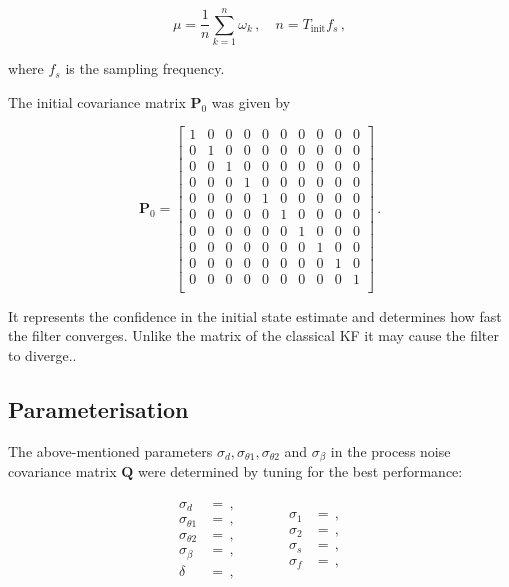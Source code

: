 \begin{equation}
  \mu = \frac{1}{n} \sum_{k=1}^{n}{\omega_k}\,, \quad n = T_{\text{init}} f_s\,,
\end{equation}

\noindent
where $f_s$ is the sampling frequency.

The initial covariance matrix $\mathbf{P}_{0}$ was given by

\begin{equation}
\mathbf{P}_0 = \begin{bmatrix}
  1 & 0 & 0 & 0 & 0 & 0 & 0 & 0 & 0 & 0\\
  0 & 1 & 0 & 0 & 0 & 0 & 0 & 0 & 0 & 0\\
  0 & 0 & 1 & 0 & 0 & 0 & 0 & 0 & 0 & 0\\
  0 & 0 & 0 & 1 & 0 & 0 & 0 & 0 & 0 & 0\\
  0 & 0 & 0 & 0 & 1 & 0 & 0 & 0 & 0 & 0\\
  0 & 0 & 0 & 0 & 0 & 1 & 0 & 0 & 0 & 0\\
  0 & 0 & 0 & 0 & 0 & 0 & 1 & 0 & 0 & 0\\
  0 & 0 & 0 & 0 & 0 & 0 & 0 & 1 & 0 & 0\\
  0 & 0 & 0 & 0 & 0 & 0 & 0 & 0 & 1 & 0\\
  0 & 0 & 0 & 0 & 0 & 0 & 0 & 0 & 0 & 1\\
\end{bmatrix}\,.
\end{equation}

\noindent
It represents the confidence in the initial state estimate and determines how fast the filter converges. Unlike the matrix of the classical KF it may cause the filter to diverge..

\subsection{Parameterisation}

The above-mentioned parameters $\sigma_d, \sigma_{\theta 1}, \sigma_{\theta 2}$ and $\sigma_{\beta}$ in the process noise covariance matrix $\mathbf{Q}$ were determined by tuning for the best performance:

\begin{equation}
\begin{matrix}
	\begin{split}
	  \sigma_d &= \,, \\
	  \sigma_{\theta 1} &= \,, \\
	  \sigma_{\theta 2} &= \,, \\
	  \sigma_{\beta} &= \,, \\
	  \delta &= \,,
\end{split} \qquad \quad
    \begin{split}
	  \sigma_1 &= \,, \\
	  \sigma_2 &= \,, \\
	  \sigma_s &= \,, \\
	  \sigma_f &= \,,  
\end{split}
\end{matrix}
\end{equation}

